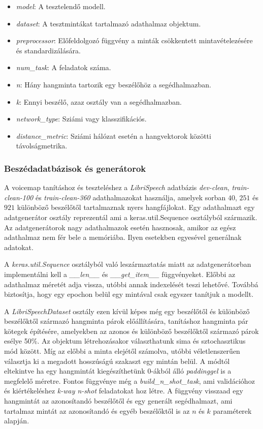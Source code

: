 \begin{itemize}
	\item  \emph{model}: A tesztelendő modell.
	\item  \emph{dataset}: A tesztmintákat tartalmazó adathalmaz objektum.
	\item  \emph{preprocessor}: Előfeldolgozó függvény a minták csökkentett mintavételezésére és standardizálására.
	\item  \emph{num\_task}: A feladatok száma.
	\item  \emph{n}: Hány hangminta tartozik egy beszélőhöz a segédhalmazban.
	\item  \emph{k}: Ennyi beszélő, azaz osztály van a segédhalmazban.
	\item  \emph{network\_type}: Sziámi vagy klasszifikációs.
	\item  \emph{distance\_metric}: Sziámi hálózat esetén a hangvektorok közötti távolságmetrika.
\end{itemize}

\subsubsection{Beszédadatbázisok és generátorok}

A voicemap tanításhoz és teszteléshez a \emph{LibriSpeech} adatbázis \emph{dev-clean}, \emph{train-clean-100} és \emph{train-clean-360} adathalmazokat használja, amelyek sorban $40$, $251$ és $921$ különböző beszélőtől tartalmaznak nyers hangfájlokat. Egy adathalmazt egy adatgenerátor osztály reprezentál ami a keras.util.Sequence osztályból származik. Az adatgenerátorok nagy adathalmazok esetén hasznosak, amikor az egész adathalmaz nem fér bele a memóriába. Ilyen esetekben egyesével generálnak adatokat.

A \emph{keras.util.Sequence} osztályból való leszármaztatás miatt az adatgenerátorban implementálni kell a \emph{\_\_len\_\_} és \emph{\_\_get\_item\_\_} függvényeket. Előbbi az adathalmaz méretét adja vissza, utóbbi annak indexelését teszi lehetővé. Továbbá biztosítja, hogy egy epochon belül egy mintával csak egyszer tanítjuk a modellt.

A \emph{LibriSpeechDataset} osztály ezen kívül képes még egy beszélőtől és különböző beszélőktől származó hangminta párok előállítására, tanításhoz hangminta pár kötegek építésére, amelyekben az azonos és különböző beszélőktől származó párok esélye 50\%. Az objektum létrehozásakor választhatunk sima és sztochasztikus mód között. Míg az előbbi a minta elejétől számolva, utóbbi véletlenszerűen választja ki a megadott hosszúságú szakaszt egy mintán belül. A módtól eltekintve ha egy hangmintát kiegészíthetünk 0-ákból álló \emph{paddinggel} is a megfelelő méretre. Fontos függvénye még a \emph{build\_n\_shot\_task}, ami validációhoz és kiértékeléshez \emph{k-way n-shot} feladatokat hoz létre. A függvény visszaad egy hangmintát az azonosítandó beszélőtől és egy generált segédhalmazt, ami tartalmaz mintát az azonosítandó és egyéb beszélőktől is az $n$ és $k$ paraméterek alapján.

